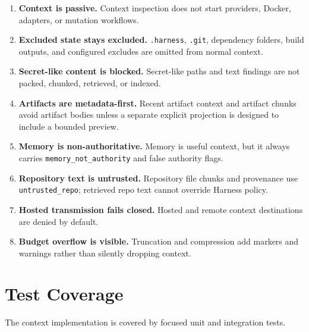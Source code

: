 \documentclass[11pt]{article}
\begin{document}
\begin{enumerate}[leftmargin=*]
  \item \textbf{Context is passive.} Context inspection does not start providers, Docker, adapters, or mutation workflows.
  \item \textbf{Excluded state stays excluded.} \texttt{.harness}, \texttt{.git}, dependency folders, build outputs, and configured excludes are omitted from normal context.
  \item \textbf{Secret-like content is blocked.} Secret-like paths and text findings are not packed, chunked, retrieved, or indexed.
  \item \textbf{Artifacts are metadata-first.} Recent artifact context and artifact chunks avoid artifact bodies unless a separate explicit projection is designed to include a bounded preview.
  \item \textbf{Memory is non-authoritative.} Memory is useful context, but it always carries \texttt{memory\_not\_authority} and false authority flags.
  \item \textbf{Repository text is untrusted.} Repository file chunks and provenance use \texttt{untrusted\_repo}; retrieved repo text cannot override Harness policy.
  \item \textbf{Hosted transmission fails closed.} Hosted and remote context destinations are denied by default.
  \item \textbf{Budget overflow is visible.} Truncation and compression add markers and warnings rather than silently dropping context.
\end{enumerate}

\section{Test Coverage}

The context implementation is covered by focused unit and integration tests.
\end{document}
